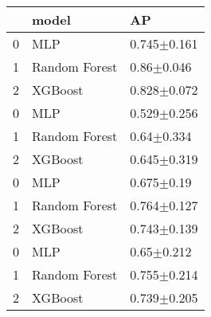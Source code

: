 \begin{tabular}{lll}
\toprule
 & model & AP \\
\midrule
0 & MLP & 0.745$\pm$0.161 \\
1 & Random Forest & 0.86$\pm$0.046 \\
2 & XGBoost & 0.828$\pm$0.072 \\
0 & MLP & 0.529$\pm$0.256 \\
1 & Random Forest & 0.64$\pm$0.334 \\
2 & XGBoost & 0.645$\pm$0.319 \\
0 & MLP & 0.675$\pm$0.19 \\
1 & Random Forest & 0.764$\pm$0.127 \\
2 & XGBoost & 0.743$\pm$0.139 \\
0 & MLP & 0.65$\pm$0.212 \\
1 & Random Forest & 0.755$\pm$0.214 \\
2 & XGBoost & 0.739$\pm$0.205 \\
\bottomrule
\end{tabular}
